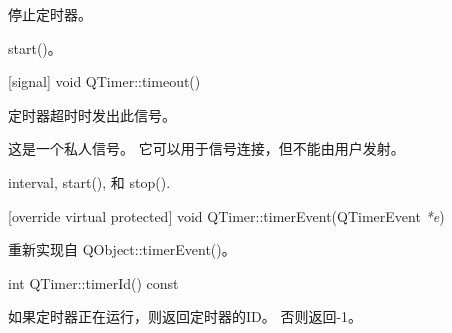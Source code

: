 停止定时器。

\begin{seeAlso}
start()。
\end{seeAlso}

[signal] void QTimer::timeout()

定时器超时时发出此信号。

\begin{notice}
这是一个私人信号。 它可以用于信号连接，但不能由用户发射。
\end{notice}

\begin{seeAlso}
interval, start(), 和 stop().
\end{seeAlso}

[override virtual protected] void QTimer::timerEvent(QTimerEvent \emph{*e})

重新实现自 QObject::timerEvent()。

int QTimer::timerId() const

如果定时器正在运行，则返回定时器的ID。 否则返回-1。




